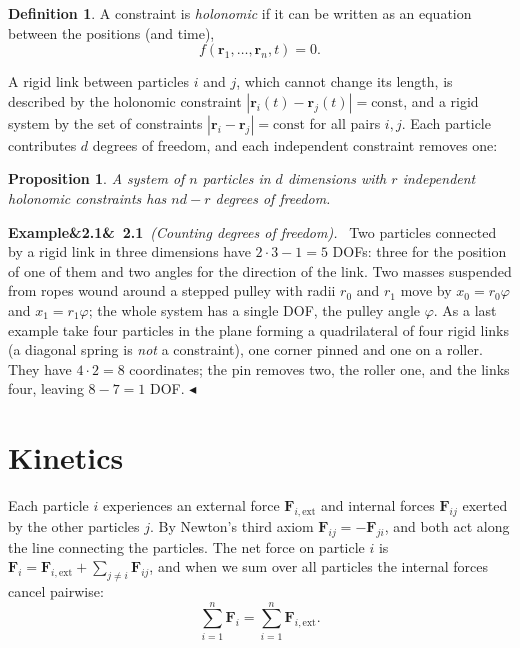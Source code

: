 \documentclass[11pt,a4paper,oneside]{report}
\numberwithin{equation}{chapter}
\newcommand{\vect}[1]{\bm{#1}}
\newcommand{\ext}{\mathrm{ext}}
\theoremstyle{plain}
\newtheorem{proposition}[theorem]{Proposition}
\theoremstyle{definition}
\newtheorem{definition}[theorem]{Definition}
\theoremstyle{remark}
\newenvironment{example}[2]{%
  \par\addvspace{\bigskipamount}\noindent
  \textbf{Example\ifx&#1&\else~#1\fi}\ \textit{(#2).}\ \ignorespaces}%
  {\hfill$\blacktriangleleft$\par\addvspace{\bigskipamount}}
\begin{document}
\begin{definition}
A constraint is \emph{holonomic} if it can be written as an equation between the positions (and time),
\[f(\vect r_1,\dots,\vect r_n,t)=0.\]
\end{definition}

A rigid link between particles $i$ and $j$, which cannot change its length, is described by the holonomic constraint
$|\vect r_i(t)-\vect r_j(t)|=\text{const}$, and a rigid system by the set of constraints
$|\vect r_i-\vect r_j|=\text{const}$ for all pairs $i,j$. Each particle contributes $d$ degrees of freedom, and each
independent constraint removes one:

\begin{proposition}
A system of $n$ particles in $d$ dimensions with $r$ independent holonomic constraints has $nd-r$ degrees of freedom.
\end{proposition}

\begin{example}{2.1}{Counting degrees of freedom}
Two particles connected by a rigid link in three dimensions have $2\cdot3-1=5$ DOFs: three for the position of one
of them and two angles for the direction of the link. Two masses suspended from ropes wound around a stepped pulley
with radii $r_0$ and $r_1$ move by $x_0=r_0\varphi$ and $x_1=r_1\varphi$; the whole system has a single DOF, the
pulley angle $\varphi$. As a last example take four particles in the plane forming a quadrilateral of four rigid
links (a diagonal spring is \emph{not} a constraint), one corner pinned and one on a roller. They have $4\cdot2=8$
coordinates; the pin removes two, the roller one, and the links four, leaving $8-7=1$ DOF.
\end{example}

\section{Kinetics}

Each particle $i$ experiences an external force $\vect F_{i,\ext}$ and internal forces $\vect F_{ij}$ exerted by the
other particles $j$. By Newton's third axiom $\vect F_{ij}=-\vect F_{ji}$, and both act along the line connecting the
particles. The net force on particle $i$ is $\vect F_i=\vect F_{i,\ext}+\sum_{j\neq i}\vect F_{ij}$, and when we sum
over all particles the internal forces cancel pairwise:
\begin{equation}\label{eq:sum-forces}
  \sum_{i=1}^{n}\vect F_i=\sum_{i=1}^{n}\vect F_{i,\ext}.
\end{equation}
\end{document}
